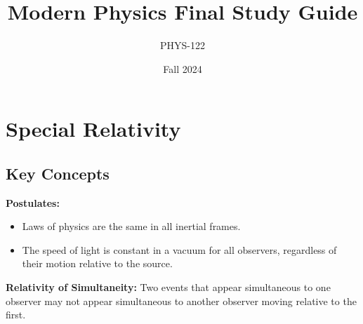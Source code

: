 \documentclass{article}
\title{Modern Physics Final Study Guide}
\author{PHYS-122}
\date{Fall 2024}
\newcommand{\conceptbox}[1]{\begin{tcolorbox}[colback=blue!10] #1 \end{tcolorbox}}
\begin{document}
\maketitle

\newpage

\tableofcontents

\newpage

\section{Special Relativity}

\subsection{Key Concepts}

\conceptbox{
\textbf{Postulates:} 
\begin{itemize}
    \item Laws of physics are the same in all inertial frames.
    \item The speed of light is constant in a vacuum for all observers, regardless of their motion relative to the source.
\end{itemize}
}

\conceptbox{
\textbf{Relativity of Simultaneity:} 
Two events that appear simultaneous to one observer may not appear simultaneous to another observer moving relative to the first.
}
\end{document}
